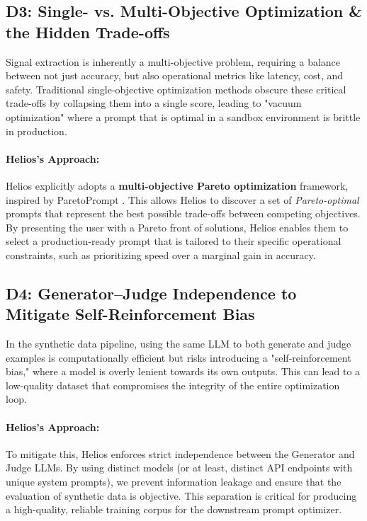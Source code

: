 \documentclass{article}
\begin{document}
\subsection*{D3: Single- vs. Multi-Objective Optimization \& the Hidden Trade-offs}
Signal extraction is inherently a multi-objective problem, requiring a balance between not just accuracy, but also operational metrics like latency, cost, and safety. Traditional single-objective optimization methods obscure these critical trade-offs by collapsing them into a single score, leading to "vacuum optimization" where a prompt that is optimal in a sandbox environment is brittle in production.

\paragraph{Helios's Approach:} Helios explicitly adopts a \textbf{multi-objective Pareto optimization} framework, inspired by ParetoPrompt \citep{zhao2025pareto}. This allows Helios to discover a set of \emph{Pareto-optimal} prompts that represent the best possible trade-offs between competing objectives. By presenting the user with a Pareto front of solutions, Helios enables them to select a production-ready prompt that is tailored to their specific operational constraints, such as prioritizing speed over a marginal gain in accuracy.

\subsection*{D4: Generator--Judge Independence to Mitigate Self-Reinforcement Bias}
In the synthetic data pipeline, using the same LLM to both generate and judge examples is computationally efficient but risks introducing a "self-reinforcement bias," where a model is overly lenient towards its own outputs. This can lead to a low-quality dataset that compromises the integrity of the entire optimization loop.

\paragraph{Helios's Approach:} To mitigate this, Helios enforces strict independence between the Generator and Judge LLMs. By using distinct models (or at least, distinct API endpoints with unique system prompts), we prevent information leakage and ensure that the evaluation of synthetic data is objective. This separation is critical for producing a high-quality, reliable training corpus for the downstream prompt optimizer.
\end{document}
